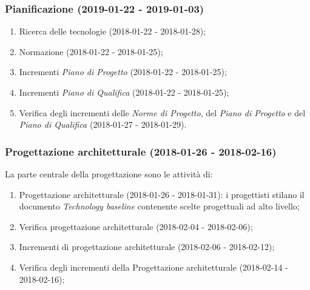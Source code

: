 \subsubsection{Pianificazione (2019-01-22 - 2019-01-03)\\} 
			\begin{enumerate}[label = 3.1.\arabic*)]
				\item Ricerca delle tecnologie (2018-01-22 - 2018-01-28);
				\item Normazione (2018-01-22 - 2018-01-25);
				\item Incrementi \textit{Piano di Progetto} (2018-01-22 - 2018-01-25);
				\item Incrementi \textit{Piano di Qualifica} (2018-01-22 - 2018-01-25);
				\item Verifica degli incrementi delle \textit{Norme di Progetto}, del \textit{Piano di Progetto} e del \textit{Piano di Qualifica} (2018-01-27 - 2018-01-29).
			\end{enumerate}
	
		\subsubsection{Progettazione architetturale (2018-01-26 - 2018-02-16)\\} La parte centrale della progettazione sono le attività di:
			\begin{enumerate}[label = 3.2.\arabic*)]
				\item Progettazione architetturale (2018-01-26 - 2018-01-31): i progettisti stilano il documento \textit{Technology baseline} contenente scelte progettuali ad alto livello;
				\item Verifica progettazione architetturale (2018-02-04 - 2018-02-06);
				\item Incrementi di progettazione architetturale (2018-02-06 - 2018-02-12);
				\item Verifica degli incrementi della Progettazione architetturale (2018-02-14 - 2018-02-16);
			\end{enumerate}

